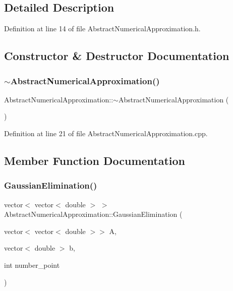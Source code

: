 \subsection{Detailed Description}


Definition at line 14 of file Abstract\+Numerical\+Approximation.\+h.



\subsection{Constructor \& Destructor Documentation}
\mbox{\label{class_abstract_numerical_approximation_a358054cadc54f5d0c7891505da040783}} 
\subsubsection{\texorpdfstring{$\sim$\+Abstract\+Numerical\+Approximation()}{~AbstractNumericalApproximation()}}
{\footnotesize\ttfamily Abstract\+Numerical\+Approximation\+::$\sim$\+Abstract\+Numerical\+Approximation (\begin{DoxyParamCaption}{ }\end{DoxyParamCaption})}



Definition at line 21 of file Abstract\+Numerical\+Approximation.\+cpp.



\subsection{Member Function Documentation}
\mbox{\label{class_abstract_numerical_approximation_aed569247300dcb9eb54c6117903d2583}} 
\subsubsection{\texorpdfstring{Gaussian\+Elimination()}{GaussianElimination()}}
{\footnotesize\ttfamily vector$<$ vector$<$ double $>$ $>$ Abstract\+Numerical\+Approximation\+::\+Gaussian\+Elimination (\begin{DoxyParamCaption}\item[{vector$<$ vector$<$ double $>$$>$}]{A,  }\item[{vector$<$ double $>$}]{b,  }\item[{int}]{number\+\_\+point }\end{DoxyParamCaption})}



